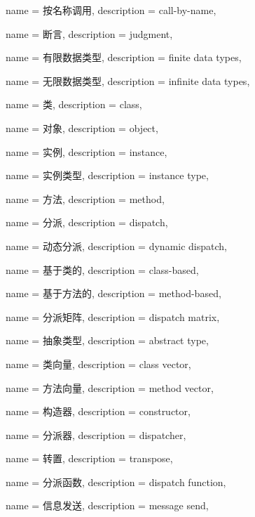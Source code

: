 {
	name = 按名称调用,
	description = {call-by-name},
}

{
	name = 断言,
	description = {judgment},
}

{
	name = 有限数据类型,
	description = {finite data types},
}


{
	name = 无限数据类型,
	description = {infinite data types},
}

{
    name = 类,
    description = {class},
}

{
    name = 对象,
    description = {object},
}

{
    name = 实例,
    description = {instance},
}

{
    name = 实例类型,
    description = {instance type},
}

{
    name = 方法,
    description = {method},
}

{
    name = 分派,
    description = {dispatch},
}

{
    name = 动态分派,
    description = {dynamic dispatch},
}

{
    name = 基于类的,
    description = {class-based},
}

{
    name = 基于方法的,
    description = {method-based},
}

{
    name = 分派矩阵,
    description = {dispatch matrix},
}

{
    name = 抽象类型,
    description = {abstract type},
}

{
    name = 类向量,
    description = {class vector},
}

{
    name = 方法向量,
    description = {method vector},
}

{
    name = 构造器,
    description = {constructor},
}

{
    name = 分派器,
    description = {dispatcher},
}

{
    name = 转置,
    description = {transpose},
}

{
    name = 分派函数,
    description = {dispatch function},
}

{
    name = 信息发送,
    description = {message send},
}







